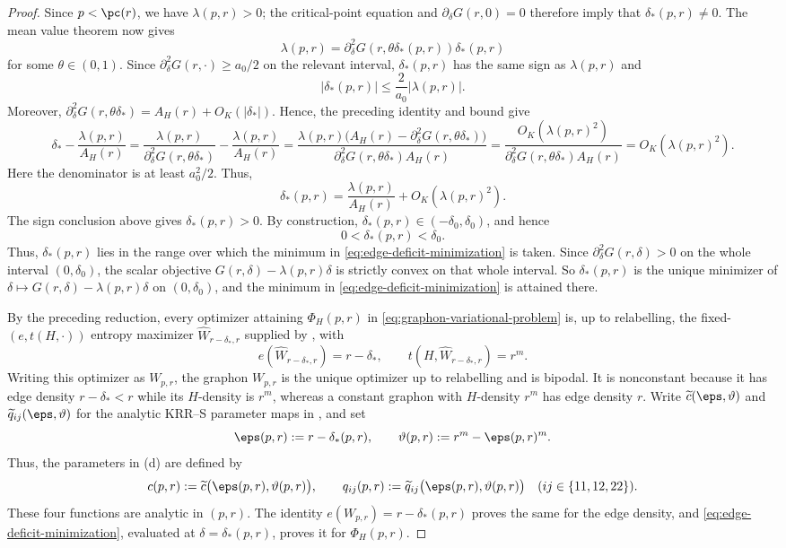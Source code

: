 \begin{proof}
Since $p<\pc(r)$, we have $\lambda(p,r)>0$; the critical-point equation and
$\partial_\delta G(r,0)=0$ therefore imply that $\delta_*(p,r)\ne0$.
The mean value theorem now gives
\[
  \lambda(p,r)
  =
  \partial_\delta^2G(r,\theta\delta_*(p,r))\delta_*(p,r)
\]
for some \(\theta\in(0,1)\).  Since
\(\partial_\delta^2G(r,\cdot)\ge a_0/2\) on the relevant interval,
\(\delta_*(p,r)\) has the same sign as \(\lambda(p,r)\) and
\[
  |\delta_*(p,r)|
  \le \frac{2}{a_0}|\lambda(p,r)|.
\]
Moreover,
\(\partial_\delta^2G(r,\theta\delta_*)=A_H(r)+O_K(|\delta_*|)\).  Hence, the preceding
identity and bound give
\[
  \delta_*-\frac{\lambda(p,r)}{A_H(r)}
  =\frac{\lambda(p,r)}{\partial_\delta^2G(r,\theta\delta_*)}
  -\frac{\lambda(p,r)}{A_H(r)}
  =
  \frac{\lambda(p,r)
  \bigl(A_H(r)-\partial_\delta^2G(r,\theta\delta_*)\bigr)}
  {\partial_\delta^2G(r,\theta\delta_*)A_H(r)}
  =
  \frac{O_K(\lambda(p,r)^2)}
  {\partial_\delta^2G(r,\theta\delta_*)A_H(r)}
  =O_K(\lambda(p,r)^2).
\]
Here the denominator is at least \(a_0^2/2\).  Thus,
\begin{equation}\label{eq:optimal-deficit-expansion}
  \delta_*(p,r)
  =
  \frac{\lambda(p,r)}{A_H(r)}+O_K(\lambda(p,r)^2).
\end{equation}
The sign conclusion above gives $\delta_*(p,r)>0$.  By construction,
$\delta_*(p,r)\in(-\delta_0,\delta_0)$, and hence
\[
  0<\delta_*(p,r)<\delta_0.
\]
Thus, $\delta_*(p,r)$ lies in the range over which the minimum in
\eqref{eq:edge-deficit-minimization} is taken.
Since $\partial_\delta^2G(r,\delta)>0$ on the whole interval
$(0,\delta_0)$, the scalar objective
$G(r,\delta)-\lambda(p,r)\delta$ is strictly convex on that whole interval.
So $\delta_*(p,r)$ is the unique minimizer of
$\delta\mapsto G(r,\delta)-\lambda(p,r)\delta$ on $(0,\delta_0)$, and the
minimum in \eqref{eq:edge-deficit-minimization} is attained there.

By the preceding reduction, every optimizer attaining $\Phi_H(p,r)$ in
\eqref{eq:graphon-variational-problem} is, up to relabelling, the fixed-$(e,t(H,\cdot))$
entropy maximizer $\widehat W_{r-\delta_*,r}$ supplied by
, with
\[
  e(\widehat W_{r-\delta_*,r})=r-\delta_*,
  \qquad
  t(H,\widehat W_{r-\delta_*,r})=r^m.
\]
Writing this optimizer as $W_{p,r}$, the graphon $W_{p,r}$ is the unique optimizer up to
relabelling and is bipodal.  It is nonconstant because it has edge density
\(r-\delta_*<r\) while its \(H\)-density is \(r^m\), whereas a constant graphon
with \(H\)-density \(r^m\) has edge density \(r\).
Write $\widetilde c(\eps,\vartheta)$ and
$\widetilde q_{ij}(\eps,\vartheta)$ for the analytic KRR--S parameter maps in
, and set
\[
  \eps(p,r):=r-\delta_*(p,r),
  \qquad
  \vartheta(p,r):=r^m-\eps(p,r)^m.
\]
Thus, the parameters in \textup{(d)} are defined by
\[
  c(p,r):=\widetilde c\bigl(\eps(p,r),\vartheta(p,r)\bigr),
  \qquad
  q_{ij}(p,r):=
  \widetilde q_{ij}\bigl(\eps(p,r),\vartheta(p,r)\bigr)
  \quad(ij\in\{11,12,22\}).
\]
These four functions are analytic in $(p,r)$.  The identity
$e(W_{p,r})=r-\delta_*(p,r)$ proves the same for the edge density, and
\eqref{eq:edge-deficit-minimization}, evaluated at
$\delta=\delta_*(p,r)$, proves it for $\Phi_H(p,r)$.


\end{proof}
